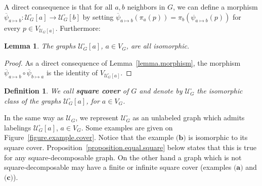 \documentclass{article}
\newtheorem{lemma}[theorem]{Lemma}
\newtheorem{definition}[theorem]{Definition}
\newcommand\quadcover[1]{\mathcal{U}^\square_{#1}}
\begin{document}
A direct consequence is that for all $a,b$ neighbors in $G$, we can define a morphism $\overline{\psi}_{a \mapsto b} : \quadcover{G}[a] \rightarrow \quadcover{G}[b]$ by setting $\overline{\psi}_{a \mapsto b} (\pi_a(p)) = \pi_b\left(\psi_{a\mapsto b}(p)\right)$ for every $p \in V_{\mathcal{U}_G[a]}$. Furthermore: 

\begin{lemma}
The graphs $\quadcover{G}[a]$, $a \in V_G$, are all isomorphic. 
\end{lemma}

\begin{proof}
As a direct consequence of Lemma~\ref{lemma.morphism}, 
the morphism $\overline{\psi}_{a \mapsto b} \circ \overline{\psi}_{b \mapsto a}$ is the identity of $V_{\quadcover{G}[a]}$.
\end{proof}

\begin{definition}\label{definition.square.cover}
We call \textbf{square cover} of $G$ and denote by $\quadcover{G}$ the isomorphic class of the graphs $\quadcover{G}[a]$, for $a \in V_G$.
\end{definition}

In the same way as $\mathcal{U}_G$, we represent $\quadcover{G}$ as an unlabeled graph which admits labelings $\mathcal{U}_G^{\square}[a]$, $a \in V_G$. Some examples are given on Figure~\ref{figure.example.cover}. Notice that the example $\textbf{(b)}$ is isomorphic to its square cover. Proposition~\ref{proposition.equal.square} below states that this is true for any square-decomposable graph. On the other hand a graph which is not square-decomposable may have a finite or infinite square cover (examples $\textbf{(a)}$ and $\textbf{(c)}$). 
\end{document}
